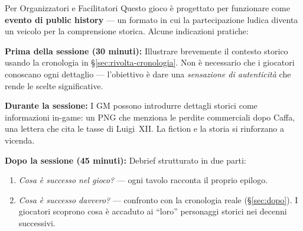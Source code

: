 \begin{rulebox}[GoldRPG]{Per Organizzatori e Facilitatori}
Questo gioco è progettato per funzionare come \textbf{evento di public
history} — un formato in cui la partecipazione ludica diventa un veicolo
per la comprensione storica. Alcune indicazioni pratiche:

\medskip
\textbf{Prima della sessione (30 minuti):}
Illustrare brevemente il contesto storico usando la cronologia in
\S\ref{sec:rivolta-cronologia}. Non è necessario che i giocatori
conoscano ogni dettaglio — l'obiettivo è dare una \textit{sensazione
di autenticità} che rende le scelte significative.

\medskip
\textbf{Durante la sessione:}
I GM possono introdurre dettagli storici come informazioni in-game:
un PNG che menziona le perdite commerciali dopo Caffa,
una lettera che cita le tasse di Luigi~XII. La fiction e la storia
si rinforzano a vicenda.

\medskip
\textbf{Dopo la sessione (45 minuti):}
Debrief strutturato in due parti:
\begin{enumerate}
  \item \textit{Cosa è successo nel gioco?} — ogni tavolo racconta il proprio epilogo.
  \item \textit{Cosa è successo davvero?} — confronto con la cronologia reale
        (\S\ref{sec:dopo}). I giocatori scoprono cosa è accaduto ai
        ``loro'' personaggi storici nei decenni successivi.
\end{enumerate}

\medskip
\end{rulebox}
